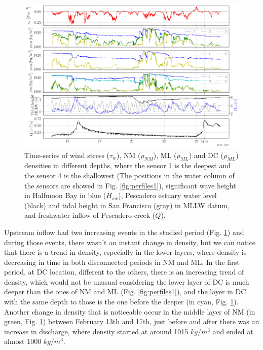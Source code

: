\documentclass[tesis.tex]{subfiles}
\begin{document}
\begin{figure}[h!]
    \centering
    \includegraphics[width=\textwidth]{Imagenes/dens.png}
    \caption{Time-series of wind stress ($\tau_w$), NM ($\rho_{NM}$), ML ($\rho_{ML}$) and DC ($\rho_{ML}$) densities in different depths, where the sensor 1 is the deepest and the sensor 4 is the shallowest (The positions in the water column of the sensors are showed in Fig. \ref{fig:perfiles1}), significant wave height in Halfmoon Bay in blue ($H_{sw}$), Pescadero estuary water level (black) and tidal height in San Francisco (gray) in MLLW datum, and freshwater inflow of Pescadero creek ($Q$).}
    \label{fig:dens}
\end{figure}


Upstream inflow had two increasing events in the studied period (Fig. \ref{fig:dens}) and during those events, there wasn't an instant change in density, but we can notice that there is a trend in density, especially in the lower layers, where density is decreasing in time in both disconnected periods in NM and ML. In the first period, at DC location, different to the others, there is an increasing trend of density, which would not be unusual considering the lower layer of DC is much deeper than the ones of NM and ML (Fig. \ref{fig:perfiles1}), and the layer in DC with the same depth to those is the one before the deeper (in cyan, Fig. \ref{fig:dens}). Another change in density that is noticeable occur in the middle layer of NM (in green, Fig. \ref{fig:dens}) between February 13th and 17th, just before and after there was an increase in discharge, where density started at around 1015 $kg/m^3$ and ended at almost 1000 $kg/m^3$. \\
\end{document}
